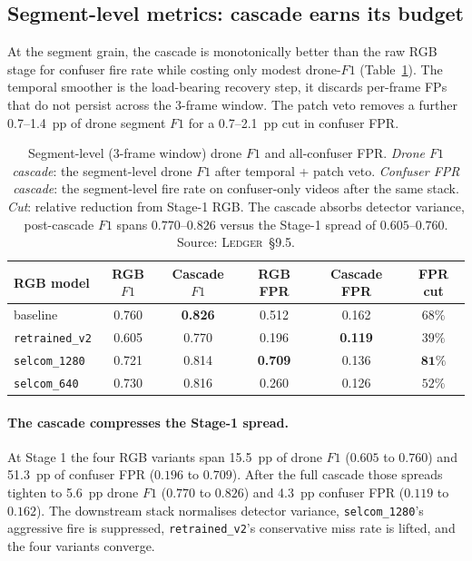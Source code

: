 \documentclass[12pt,a4paper,oneside,openright]{book}
\begin{document}
\subsection{Segment-level metrics: cascade earns its budget}

At the segment grain, the cascade is monotonically better than the raw RGB stage for confuser fire rate while costing only modest drone-$F1$ (Table~\ref{tab:cascade_segment}). The temporal smoother is the load-bearing recovery step, it discards per-frame FPs that do not persist across the 3-frame window. The patch veto removes a further 0.7--1.4~pp of drone segment $F1$ for a 0.7--2.1~pp cut in confuser FPR.

\begin{table}[htbp]
    \centering
    \caption{Segment-level (3-frame window) drone $F1$ and all-confuser FPR. \emph{Drone $F1$ cascade}: the segment-level drone $F1$ after temporal + patch veto. \emph{Confuser FPR cascade}: the segment-level fire rate on confuser-only videos after the same stack. \emph{Cut}: relative reduction from Stage-1 RGB. The cascade absorbs detector variance, post-cascade $F1$ spans $0.770$--$0.826$ versus the Stage-1 spread of $0.605$--$0.760$. Source: \textsc{Ledger}~\S9.5.}
    \label{tab:cascade_segment}
    \begin{tabular}{lccccc}
        \toprule
        RGB model & RGB $F1$ & Cascade $F1$ & RGB FPR & Cascade FPR & FPR cut \\
        \midrule
        baseline           & 0.760 & \textbf{0.826} & 0.512 & 0.162 & $68\%$ \\
        \texttt{retrained\_v2} & 0.605 & 0.770 & 0.196 & \textbf{0.119} & $39\%$ \\
        \texttt{selcom\_1280}  & 0.721 & 0.814 & \textbf{0.709} & 0.136 & $\mathbf{81\%}$ \\
        \texttt{selcom\_640}   & 0.730 & 0.816 & 0.260 & 0.126 & $52\%$ \\
        \bottomrule
    \end{tabular}
\end{table}

\paragraph{The cascade compresses the Stage-1 spread.}
At Stage 1 the four RGB variants span 15.5~pp of drone $F1$ ($0.605$ to $0.760$) and 51.3~pp of confuser FPR ($0.196$ to $0.709$). After the full cascade those spreads tighten to 5.6~pp drone $F1$ ($0.770$ to $0.826$) and 4.3~pp confuser FPR ($0.119$ to $0.162$). The downstream stack normalises detector variance, \texttt{selcom\_1280}'s aggressive fire is suppressed, \texttt{retrained\_v2}'s conservative miss rate is lifted, and the four variants converge.
\end{document}

